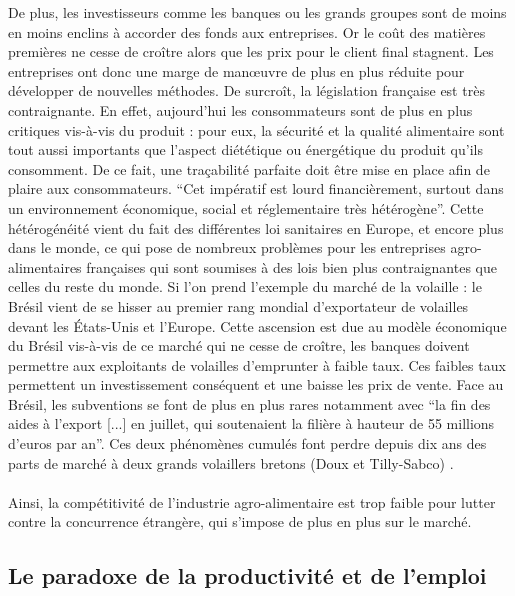 \documentclass[a4paper,12pt]{report}
\begin{document}
			De plus, les investisseurs comme les banques ou les grands groupes sont de moins en moins enclins à accorder des fonds aux entreprises. Or le coût des matières premières ne cesse de croître alors que les prix pour le client final stagnent. Les entreprises ont donc une marge de manœuvre de plus en plus réduite pour développer de nouvelles méthodes. De surcroît, la législation française est très contraignante. En effet, aujourd’hui les consommateurs sont de plus en plus critiques vis-à-vis du produit : pour eux, la sécurité et la qualité alimentaire sont tout aussi importants que l’aspect diététique ou énergétique du produit qu’ils consomment. De ce fait, une traçabilité parfaite doit être mise en place afin de plaire aux consommateurs. “Cet impératif est lourd financièrement, surtout dans un environnement économique, social et réglementaire très hétérogène”\cite{SecteurAAFrancaisEnjeuxXXISiecle}. Cette hétérogénéité vient du fait des différentes loi sanitaires en Europe, et encore plus dans le monde, ce qui pose de nombreux problèmes pour les entreprises agro-alimentaires françaises qui sont soumises à des lois bien plus contraignantes que celles du reste du monde. Si l’on prend l’exemple du marché de la volaille : le Brésil vient de se hisser au premier rang mondial d’exportateur de volailles devant les États-Unis et l’Europe. Cette ascension est due au modèle économique du Brésil vis-à-vis de ce marché qui ne cesse de croître, les banques doivent permettre aux exploitants de volailles d'emprunter à faible taux. Ces faibles taux permettent un investissement conséquent et une baisse les prix de vente. Face au Brésil, les subventions se font de plus en plus rares notamment avec “la fin des aides à l'export [...] en juillet, qui soutenaient la filière à hauteur de 55 millions d'euros par an”.\cite{PouletBresilienMoinsCherBreton} Ces deux phénomènes cumulés font perdre depuis dix ans des parts de marché à deux grands volaillers bretons (Doux et Tilly-Sabco) .
			
		\paragraph{}Ainsi, la compétitivité de l'industrie agro-alimentaire est trop faible pour lutter contre la concurrence étrangère, qui s'impose de plus en plus sur le marché.
			

		\subsection{Le paradoxe de la productivité et de l'emploi}
\end{document}
